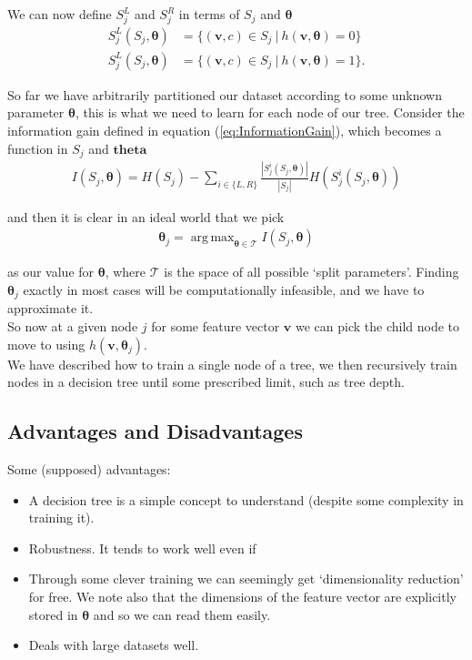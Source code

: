 \documentclass{article}
\newcommand{\vc}[1]{
    \mathbf{#1}
 }
\DeclareMathOperator*{\argmax}{arg\,max}
\theoremstyle{definition}
\begin{document}
We can now define $S_j^L$ and $S_j^R$ in terms of $S_j$ and $\vc{\theta}$
\begin{align}
    S_j^L(S_j, \vc{\theta}) &= \{ (\vc{v}, c) \in S_j\ |\ h(\vc{v}, \vc{\theta}) = 0 \} \\
    S_j^L(S_j, \vc{\theta}) &= \{ (\vc{v}, c) \in S_j\ |\ h(\vc{v}, \vc{\theta}) = 1 \}. 
\end{align}

So far we have arbitrarily partitioned our dataset according to some unknown parameter $\vc{\theta}$, this is what 
we need to learn for each node of our tree. Consider the information gain defined in equation (\ref{eq:InformationGain}), 
which becomes a function in $S_j$ and $\vc{theta}$
\begin{align}
    I(S_j,\vc{\theta}) = H(S_j) - \sum_{i\in\{L,R\}} \frac{|S_j^i(S_j,\vc{\theta})|}{|S_j|} H(S_j^i(S_j,\vc{\theta}))
\end{align}

and then it is clear in an ideal world that we pick
\begin{align}
    \vc{\theta}_j = \argmax_{\vc{\theta}\in \mathcal{T}} I(S_j, \vc{\theta})
\end{align}

as our value for $\vc{\theta}$, where $\mathcal{T}$ is the space of all possible `split parameters'. Finding 
$\vc{\theta}_j$ exactly in most cases will be computationally infeasible, and we have to approximate it. \\

So now at a given node $j$ for some feature vector $\vc{v}$ we can pick the child node to move to using 
$h(\vc{v},\vc{\theta}_j)$. \\

We have described how to train a single node of a tree, we then recursively train nodes in a decision tree until some 
prescribed limit, such as tree depth.






\subsection{Advantages and Disadvantages}

Some (supposed) advantages:
\begin{itemize}
    \item 
        A decision tree is a simple concept to understand (despite some complexity in training it).
    \item 
        Robustness. It tends to work well even if
    \item 
        Through some clever training we can seemingly get `dimensionality reduction' for free. We note also that the 
        dimensions of the feature vector are explicitly stored in $\vc{\theta}$ and so we can read them easily.
    \item 
        Deals with large datasets well.
\end{itemize}
\end{document}
